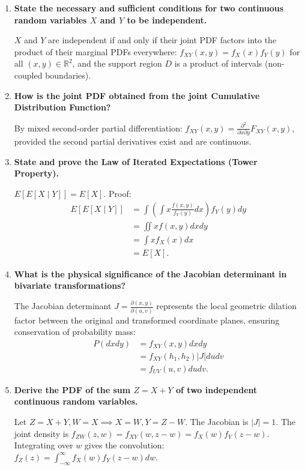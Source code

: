 \documentclass[12pt,a4paper]{article}
\newcommand{\Q}[1]{\textbf{#1}\par\noindent\ignorespaces}
\begin{document}
\begin{tcolorbox}[exambox, title={\textbf{Frequently Asked / Viva Questions}}]
\begin{enumerate}[topsep=0pt, label=\textbf{Q\arabic*.}, itemsep=5pt]
  \item \Q{State the necessary and sufficient conditions for two continuous random variables $X$ and $Y$ to be independent.}
  $X$ and $Y$ are independent if and only if their joint PDF factors into the product of their marginal PDFs everywhere: $f_{XY}(x, y) = f_X(x) f_Y(y)$ for all $(x, y) \in \mathbb{R}^2$, and the support region $D$ is a product of intervals (non-coupled boundaries).

  \item \Q{How is the joint PDF obtained from the joint Cumulative Distribution Function?}
  By mixed second-order partial differentiation: $f_{XY}(x, y) = \frac{\partial^2}{\partial x \partial y} F_{XY}(x, y)$, provided the second partial derivatives exist and are continuous.

  \item \Q{State and prove the Law of Iterated Expectations (Tower Property).}
  $E\left[E[X \mid Y]\right] = E[X]$. Proof:
  \[
    \begin{aligned}
      E[E[X \mid Y]] &= \int \left(\int x \frac{f(x,y)}{f_Y(y)} dx\right) f_Y(y) dy \\[3pt]
      &= \iint x f(x,y) dx dy \\[3pt]
      &= \int x f_X(x) dx \\[3pt]
      &= E[X].
    \end{aligned}
  \]

  \item \Q{What is the physical significance of the Jacobian determinant in bivariate transformations?}
  The Jacobian determinant $J = \frac{\partial(x, y)}{\partial(u, v)}$ represents the local geometric dilation factor between the original and transformed coordinate planes, ensuring conservation of probability mass:
  \[
    \begin{aligned}
      P(dx dy) &= f_{XY}(x, y) dx dy \\[3pt]
      &= f_{XY}(h_1, h_2) |J| du dv \\[3pt]
      &= f_{UV}(u, v) du dv.
    \end{aligned}
  \]

  \item \Q{Derive the PDF of the sum $Z = X + Y$ of two independent continuous random variables.}
  Let $Z = X + Y, W = X \implies X = W, Y = Z - W$. The Jacobian is $|J| = 1$. The joint density is $f_{ZW}(z, w) = f_{XY}(w, z - w) = f_X(w) f_Y(z - w)$. Integrating over $w$ gives the convolution: $f_Z(z) = \int_{-\infty}^\infty f_X(w) f_Y(z - w) dw$.


\end{enumerate}
\end{tcolorbox}
\end{document}
